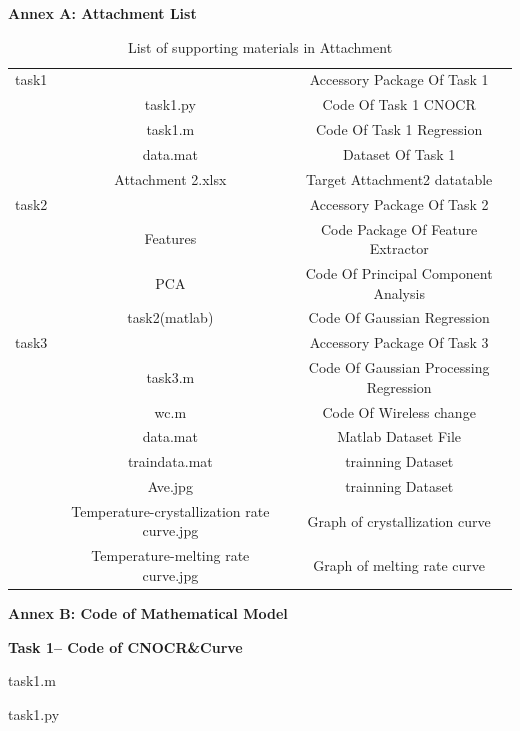 \documentclass{apmcmthesis}
\begin{document}
\centering \textbf{Annex A: Attachment List}
\begin{table}[htbp]
	\renewcommand\arraystretch{0.1}
	\centering
	\small
	\caption{List of supporting materials in Attachment}
	\begin{tabular}{ccc}
		\toprule[1.5pt]
		\makebox[0.2\textwidth][c]{Folder Name}	& \makebox[0.3\textwidth][c]{File Content}	& \makebox[0.4\textwidth][c]{File Description} \\ 
		\midrule
		task1	&	  & Accessory Package Of Task 1\\
		& task1.py  & Code Of Task 1 CNOCR\\
		& task1.m  & Code Of Task 1 Regression\\
		& data.mat  & Dataset Of Task 1\\	
		& Attachment 2.xlsx  & Target Attachment2 datatable \\	
		task2	&	  &  Accessory Package Of Task 2 \\
		& Features &  Code Package Of Feature Extractor \\
		&PCA  &Code Of Principal Component Analysis \\
		&task2(matlab)  & Code Of Gaussian Regression\\
		task3	&	  &  Accessory Package Of Task 3 \\
		&task3.m  &  Code Of Gaussian Processing Regression \\
		&wc.m  &  Code Of Wireless change \\
					&data.mat  & Matlab Dataset File \\
						&traindata.mat  &  trainning Dataset \\
							&Ave.jpg &  trainning Dataset \\
								&Temperature-crystallization rate curve.jpg  &  Graph of crystallization  curve\\
									&Temperature-melting rate curve.jpg  &  Graph of melting rate curve\\
		\bottomrule
	\end{tabular}%
	\label{tab:addlabel}%
\end{table}%
\newpage


\newpage
\centering\textbf{Annex B: Code of Mathematical Model}


\noindent\textbf{Task 1-- Code of CNOCR\&Curve}

task1.m

task1.py

\end{document}
